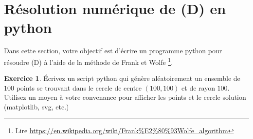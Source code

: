 \documentclass[a4paper,francais]{article}
\theoremstyle{definition}
\newtheorem{exercice}{Exercice}[section]
\newtheorem*{solution}{Solution}
\begin{document}

  

\section{Résolution numérique de (D) en python}

Dans cette section, votre objectif est d'écrire un programme python pour résoudre (D)
à l'aide de la méthode de Frank et Wolfe
\footnote{Lire \url{https://en.wikipedia.org/wiki/Frank\%E2\%80\%93Wolfe_algorithm}}. 

\begin{exercice}
  \'Ecrivez un script python qui génère aléatoirement un ensemble de $100$ points se trouvant
  dans le cercle de centre $(100,100)$ et de rayon $100$. Utilisez un moyen à votre convenance
  pour afficher les points et le cercle solution (matplotlib, svg, etc.)   
\end{exercice}
\end{document}
